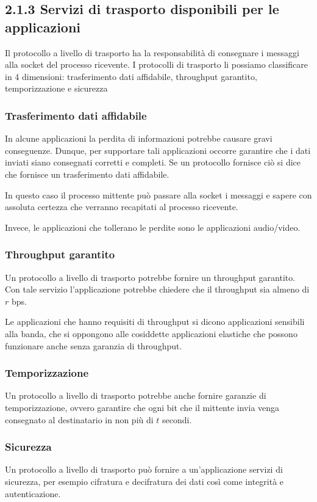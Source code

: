 \documentclass{book}
\begin{document}
\subsection*{2.1.3 Servizi di trasporto disponibili per le applicazioni}
Il protocollo a livello di trasporto ha la responsabilità di consegnare i messaggi alla socket del processo ricevente. I protocolli di trasporto li possiamo classificare in 4 dimensioni: trasferimento dati affidabile, throughput garantito, temporizzazione e sicurezza

\subsubsection*{Trasferimento dati affidabile}
In alcune applicazioni la perdita di informazioni potrebbe causare gravi conseguenze. Dunque, per supportare tali applicazioni occorre garantire che i dati inviati siano consegnati corretti e completi. Se un protocollo fornisce ciò si dice che fornisce un trasferimento dati affidabile.

In questo caso il processo mittente può passare alla socket i messaggi e sapere con assoluta certezza che verranno recapitati al processo ricevente.

Invece, le applicazioni che tollerano le perdite sono le applicazioni audio/video.

\subsubsection*{Throughput garantito}
Un protocollo a livello di trasporto potrebbe fornire un throughput garantito. Con tale servizio l'applicazione potrebbe chiedere che il throughput sia almeno di $r$ bps.

Le applicazioni che hanno requisiti di throughput si dicono applicazioni sensibili alla banda, che si oppongono alle cosiddette applicazioni elastiche che possono funzionare anche senza garanzia di throughput.

\subsubsection*{Temporizzazione}
Un protocollo a livello di trasporto potrebbe anche fornire garanzie di temporizzazione, ovvero garantire che ogni bit che il mittente invia venga consegnato al destinatario in non più di $t$ secondi.

\subsubsection*{Sicurezza}
Un protocollo a livello di trasporto può fornire a un'applicazione servizi di sicurezza, per esempio cifratura e decifratura dei dati così come integrità e autenticazione.
\end{document}
